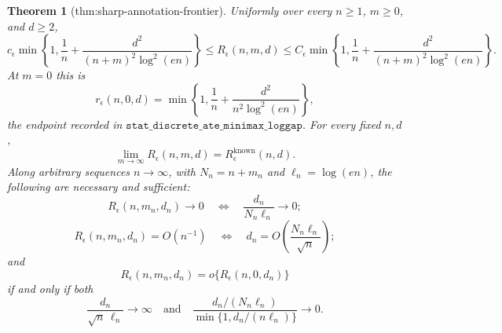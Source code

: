 \documentclass{article}
\newtheorem{theorem}{Theorem}
\begin{document}
\begin{theorem}[thm:sharp-annotation-frontier]\label{thm:sharp-annotation-frontier}
Uniformly over every \(n\ge1\), \(m\ge0\), and \(d\ge2\),
\[
 c_\epsilon\min\!\left\{1,\frac1n+\frac{d^2}{(n+m)^2\log^2(en)}\right\}
 \le R_\epsilon(n,m,d)\le
 C_\epsilon\min\!\left\{1,\frac1n+\frac{d^2}{(n+m)^2\log^2(en)}\right\}.
\]
At \(m=0\) this is
\[
 r_\epsilon(n,0,d)=\min\!\left\{1,\frac1n+\frac{d^2}{n^2\log^2(en)}\right\},
\]
the endpoint recorded in \(\texttt{stat\_discrete\_ate\_minimax\_loggap}\).  For every fixed \(n,d\),
\[
 \lim_{m\to\infty}R_\epsilon(n,m,d)=R_\epsilon^{\mathrm{known}}(n,d).
\]
Along arbitrary sequences \(n\to\infty\), with \(N_n=n+m_n\) and \(\ell_n=\log(en)\), the following are necessary and sufficient:
\[
 R_\epsilon(n,m_n,d_n)\to0
 \quad\Longleftrightarrow\quad
 \frac{d_n}{N_n\ell_n}\to0;
\]
\[
 R_\epsilon(n,m_n,d_n)=O(n^{-1})
 \quad\Longleftrightarrow\quad
 d_n=O\!\left(\frac{N_n\ell_n}{\sqrt n}\right);
\]
and
\[
 R_\epsilon(n,m_n,d_n)=o\{R_\epsilon(n,0,d_n)\}
\]
if and only if both
\[
 \frac{d_n}{\sqrt n\,\ell_n}\to\infty
 \quad\text{and}\quad
 \frac{d_n/(N_n\ell_n)}{\min\{1,d_n/(n\ell_n)\}}\to0.
\]
\end{theorem}
\end{document}
